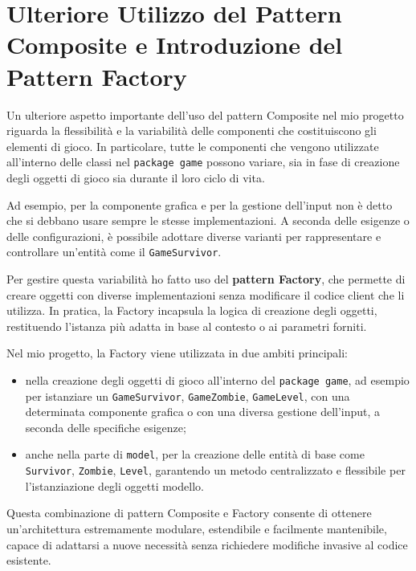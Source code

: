 \documentclass[a4paper,12pt]{report}
\begin{document}
\section{Ulteriore Utilizzo del Pattern Composite e Introduzione del Pattern Factory}

Un ulteriore aspetto importante dell’uso del pattern Composite nel mio progetto riguarda la flessibilità e la variabilità delle componenti che costituiscono gli elementi di gioco. In particolare, tutte le componenti che vengono utilizzate all’interno delle classi nel \texttt{package game} possono variare, sia in fase di creazione degli oggetti di gioco sia durante il loro ciclo di vita.

Ad esempio, per la componente grafica e per la gestione dell’input non è detto che si debbano usare sempre le stesse implementazioni. A seconda delle esigenze o delle configurazioni, è possibile adottare diverse varianti per rappresentare e controllare un’entità come il \texttt{GameSurvivor}.

Per gestire questa variabilità ho fatto uso del \textbf{pattern Factory}, che permette di creare oggetti con diverse implementazioni senza modificare il codice client che li utilizza. In pratica, la Factory incapsula la logica di creazione degli oggetti, restituendo l’istanza più adatta in base al contesto o ai parametri forniti.

Nel mio progetto, la Factory viene utilizzata in due ambiti principali:

\begin{itemize}
    \item nella creazione degli oggetti di gioco all’interno del \texttt{package game}, ad esempio per istanziare un \texttt{GameSurvivor}, \texttt{GameZombie}, \texttt{GameLevel}, con una determinata componente grafica o con una diversa gestione dell’input, a seconda delle specifiche esigenze;
    \item anche nella parte di \texttt{model}, per la creazione delle entità di base come \texttt{Survivor}, \texttt{Zombie}, \texttt{Level}, garantendo un metodo centralizzato e flessibile per l’istanziazione degli oggetti modello.
\end{itemize}

Questa combinazione di pattern Composite e Factory consente di ottenere un’architettura estremamente modulare, estendibile e facilmente mantenibile, capace di adattarsi a nuove necessità senza richiedere modifiche invasive al codice esistente.
\end{document}
